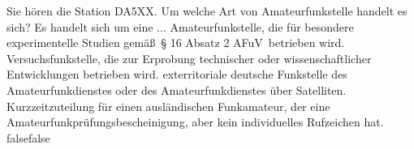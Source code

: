     {Sie hören die Station DA5XX. Um welche Art von Amateurfunkstelle handelt es sich? Es handelt sich um eine ...}
    {Amateurfunkstelle, die für besondere experimentelle Studien gemäß § 16 Absatz 2 AFuV betrieben wird.}
    {Versuchsfunkstelle, die zur Erprobung technischer oder wissenschaftlicher Entwicklungen betrieben wird.}
    {exterritoriale deutsche Funkstelle des Amateurfunkdienstes oder des Amateurfunkdienstes über Satelliten.}
    {Kurzzeitzuteilung für einen ausländischen Funkamateur, der eine Amateurfunkprüfungsbescheinigung, aber kein individuelles Rufzeichen hat.}
    {false}{false}